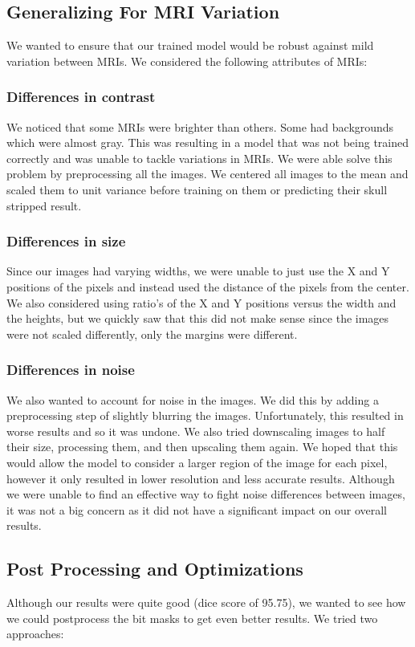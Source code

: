 \documentclass[letterpaper, 10 pt, conference]{ieeeconf}
\begin{document}
\subsection{Generalizing For MRI Variation}
We wanted to ensure that our trained model would be robust against mild variation between MRIs. We considered the following attributes of MRIs: 
\subsubsection{Differences in contrast}
We noticed that some MRIs were brighter than others. Some had backgrounds which were almost gray. This was resulting in a model that was not being trained correctly and was unable to tackle variations in MRIs. We were able solve this problem by preprocessing all the images. We centered all images to the mean and scaled them to unit variance before training on them or predicting their skull stripped result.
\subsubsection{Differences in size}
Since our images had varying widths, we were unable to just use the X and Y positions of the pixels and instead used the distance of the pixels from the center. We also considered using ratio's of the X and Y positions versus the width and the heights, but we quickly saw that this did not make sense since the images were not scaled differently, only the margins were different.
\subsubsection{Differences in noise}
We also wanted to account for noise in the images. We did this by adding a preprocessing step of slightly blurring the images. Unfortunately, this resulted in worse results and so it was undone. We also tried downscaling images to half their size, processing them, and then upscaling them again. We hoped that this would allow the model to consider a larger region of the image for each pixel, however it only resulted in lower resolution and less accurate results. Although we were unable to find an effective way to fight noise differences between images, it was not a big concern as it did not have a significant impact on our overall results.

\subsection{Post Processing and Optimizations}
Although our results were quite good (dice score of 95.75), we wanted to see how we could postprocess the bit masks to get even better results. We tried two approaches:
\end{document}

